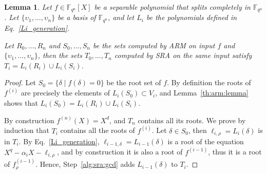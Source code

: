 \documentclass{article}
\newcommand{\ff}[1]{\mathbb{F}_{#1}}
\newcommand{\qq}{q}
\newcommand{\nn}{n}
\newcommand{\qn}{{\qq^\nn}}
\newcommand{\extf}{\ff{\qn}}
\newtheorem{Lem}{Lemma}
\begin{document}
\begin{Lem}
  \label{th:sra_eq_arm}
  Let $f\in\extf[X]$ be a separable polynomial that splits completely
  in $\extf$. Let $\{\upsilon_1,\dots,\upsilon_n\}$ be a basis of
  $\extf$, and let $L_i$ be the polynomials defined in
  Eq.~\eqref{Li_generation}.

  Let $R_0,\dots,R_n$ and $S_0,\dots,S_n$ be the sets computed by ARM
  on input $f$ and $\{\upsilon_1,\dots,\upsilon_n\}$, then the sets
  $T_0,\dots,T_n$ computed by SRA on the same input satisfy
  $T_i = L_i(R_i)\cup L_i(S_i)$.
\end{Lem}
\begin{proof}
  Let $S_0 = \{\delta\mid f(\delta)=0\}$ be the root set of $f$. %
  By definition the roots of $f^{(i)}$ are precisely the elements of
  $L_i(S_0)\subset V_i$, and Lemma~\ref{th:arm:lemma} shows that
  $L_i(S_0) = L_i(R_i)\cup L_i(S_i)$.

  By construction $f^{(n)}(X)=X^d$, and $T_n$ contains all its
  roots. %
  We prove by induction that $T_i$ contains all the roots of
  $f^{(i)}$. %
  Let $\delta\in S_0$, then $\ell_{i,\rho}=L_i(\delta)$ is in $T_i$. %
  By Eq.~\eqref{Li_generation}, $\ell_{i-1,\delta}=L_{i-1}(\delta)$ is
  a root of the equation $X^q - \alpha_iX - \ell_{i,\rho}$, and by
  construction it is also a root of $f^{(i-1)}$, thus it is a root of
  $f_\rho^{(i-1)}$. %
  Hence, Step~\ref{alg:sra:gcd} adds $L_{i-1}(\delta)$ to $T_i$.
\end{proof}
\end{document}
